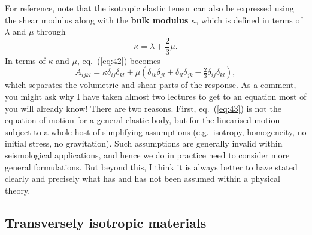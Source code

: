 For reference, note that the isotropic elastic tensor can also be expressed using the shear modulus along with the \textbf{bulk modulus}
 $\kappa$, which is defined in terms of $\lambda$ and $\mu$ through
\begin{equation}
\kappa = \lambda + \frac{2}{3}\mu.
\label{eq:44}
\end{equation}
In terms of $\kappa$ and $\mu$, eq.~(\ref{eq:42}) becomes
\begin{equation}
A_{ijkl} = \kappa\delta_{ij}\delta_{kl} + \mu\left(\delta_{ik}\delta_{jl} + \delta_{il}\delta_{jk} - \tfrac{2}{3}\delta_{ij}\delta_{kl}\right),
\label{eq:44b}
\end{equation}
which separates the volumetric and shear parts of the response.
As a comment, you might ask why I have taken almost two lectures to get to an equation most of you will already know! There are 
two reasons. First, eq.~(\ref{eq:43}) is not the equation of motion for a general elastic body, but for the linearised motion subject to a 
whole host of simplifying assumptions (e.g.\ isotropy, homogeneity, no initial stress, no gravitation). Such assumptions are generally 
invalid within seismological applications, and hence we do in practice need to consider more general formulations. But beyond this, I 
think it is always better to have stated clearly and precisely what has and has not been assumed within a physical theory.

\subsection*{Transversely isotropic materials}


